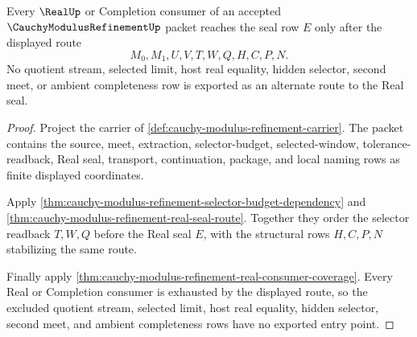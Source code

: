 \begin{theorem}
\label{thm:cauchy-modulus-refinement-root-real-seal-nonescape}
Every $\RealUp$ or Completion consumer of an accepted $\CauchyModulusRefinementUp$ packet reaches the seal row $E$ only after the displayed route
$$
M_0,M_1,U,V,T,W,Q,H,C,P,N.
$$
No quotient stream, selected limit, host real equality, hidden selector, second meet, or ambient completeness row is exported as an alternate route to the Real seal.
\end{theorem}
\begin{proof}
Project the carrier of \autoref{def:cauchy-modulus-refinement-carrier}. The packet contains the source, meet, extraction, selector-budget, selected-window, tolerance-readback, Real seal, transport, continuation, package, and local naming rows as finite displayed coordinates.

Apply \autoref{thm:cauchy-modulus-refinement-selector-budget-dependency} and \autoref{thm:cauchy-modulus-refinement-real-seal-route}. Together they order the selector readback $T,W,Q$ before the Real seal $E$, with the structural rows $H,C,P,N$ stabilizing the same route.

Finally apply \autoref{thm:cauchy-modulus-refinement-real-consumer-coverage}. Every Real or Completion consumer is exhausted by the displayed route, so the excluded quotient stream, selected limit, host real equality, hidden selector, second meet, and ambient completeness rows have no exported entry point.
\end{proof}

